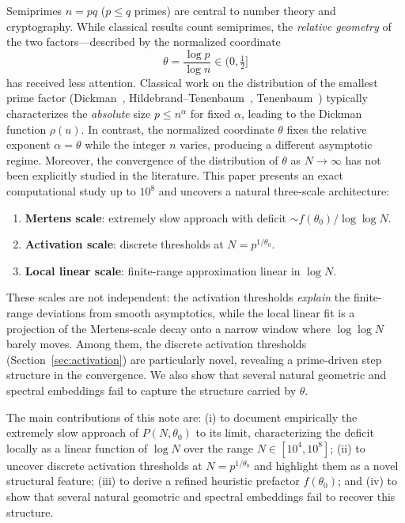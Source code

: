 \documentclass[11pt]{article}
\theoremstyle{definition}
\begin{document}
Semiprimes \(n = pq\) (\(p \le q\) primes) are central to number theory and
cryptography.  While classical results count semiprimes, the \emph{relative geometry}
of the two factors---described by the normalized coordinate
\[
  \theta = \frac{\log p}{\log n} \in (0,\tfrac{1}{2}]
\]
has received less attention.  Classical work on the distribution of the smallest
prime factor (Dickman~\cite{dickman1930}, Hildebrand--Tenenbaum~\cite{hildebrand1993},
Tenenbaum~\cite{tenenbaum1995}) typically characterizes the \emph{absolute} size
\(p \le n^{\alpha}\) for fixed \(\alpha\), leading to the Dickman function \(\rho(u)\).
In contrast, the normalized coordinate \(\theta\) fixes the relative exponent
\(\alpha = \theta\) while the integer \(n\) varies, producing a different asymptotic
regime.  Moreover, the convergence of the distribution of \(\theta\) as \(N\to\infty\)
has not been explicitly studied in the literature.  This paper presents an exact
computational study up to \(10^8\) and uncovers a natural three-scale architecture:
\begin{enumerate}[leftmargin=*]
  \item \textbf{Mertens scale}: extremely slow approach with deficit
        \(\sim f(\theta_0)/\log\log N\).
  \item \textbf{Activation scale}: discrete thresholds at \(N = p^{1/\theta_0}\).
  \item \textbf{Local linear scale}: finite-range approximation linear in \(\log N\).
\end{enumerate}
These scales are not independent: the activation thresholds \emph{explain} the finite-
range deviations from smooth asymptotics, while the local linear fit is a projection
of the Mertens-scale decay onto a narrow window where \(\log\log N\) barely moves.
Among them, the discrete activation thresholds (Section~\ref{sec:activation}) are
particularly novel, revealing a prime-driven step structure in the convergence.
We also show that several natural geometric and spectral embeddings fail to capture
the structure carried by \(\theta\).

The main contributions of this note are:
(i) to document empirically the extremely slow approach of \(P(N,\theta_0)\) to its
limit, characterizing the deficit locally as a linear function of \(\log N\) over the
range \(N \in [10^4, 10^8]\);
(ii) to uncover discrete activation thresholds at \(N = p^{1/\theta_0}\) and highlight
them as a novel structural feature;
(iii) to derive a refined heuristic prefactor \(f(\theta_0)\); and
(iv) to show that several natural geometric and spectral embeddings fail to recover
this structure.
\end{document}
